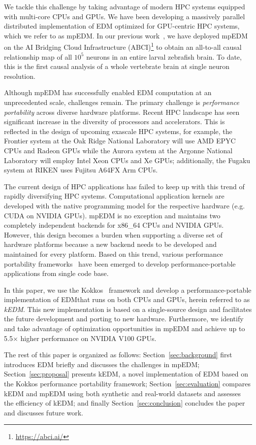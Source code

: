 \documentclass[sigconf]{acmart}
\begin{document}
We tackle this challenge by taking advantage of modern HPC systems equipped
with multi-core CPUs and GPUs. We have been developing a massively
parallel distributed implementation of EDM optimized for GPU-centric HPC
systems, which we refer to as mpEDM. In our previous work~\cite{mpedm}, we have deployed mpEDM on the AI
Bridging Cloud Infrastructure (ABCI)\footnote{\url{https://abci.ai/}} to
obtain an all-to-all causal relationship map of all $10^5$ neurons in an
entire larval zebrafish brain. To date, this is the first causal analysis
of a whole vertebrate brain at single neuron resolution.

Although mpEDM has successfully enabled EDM computation at an unprecedented
scale, challenges remain. The primary challenge is
\textit{performance portability} across diverse hardware platforms. Recent HPC
landscape has seen significant increase in the diversity of processors and
accelerators. This is reflected in the design of upcoming exascale HPC systems, for example, 
the Frontier system at the Oak Ridge National Laboratory will use AMD EPYC
CPUs and Radeon GPUs while the Aurora system at the Argonne National
Laboratory will employ Intel Xeon CPUs and Xe GPUs; additionally, the Fugaku system at RIKEN
uses Fujitsu A64FX Arm CPUs.

The current design of HPC applications has failed to keep up with this trend
of rapidly diversifying HPC systems. Computational application kernels are developed with the native programming model for the
respective hardware (e.g. CUDA on NVIDIA GPUs). mpEDM is no exception and
maintains two completely independent backends for x86\_64 CPUs and NVIDIA
GPUs. However, this design becomes a burden when supporting a diverse set of
hardware platforms because a new backend needs to be developed and maintained
for every platform. Based on this trend, various performance portability
frameworks~\cite{Deakin2019, Deakin2020} have been emerged to develop
performance-portable applications from single code base.

In this paper, we use the Kokkos~\cite{Edwards2014} framework and develop a performance-portable implementation of EDM\@ that runs on
both CPUs and GPUs, herein referred to as \textit{kEDM}. This new implementation is based on a single-source design and
facilitates the future development and porting to new hardware. Furthermore,
we identify and take advantage of optimization opportunities in mpEDM and
achieve up to 5.5$\times$ higher performance on NVIDIA V100 GPUs.

The rest of this paper is organized as follows: Section~\ref{sec:background}
first introduces EDM briefly and discusses the challenges in mpEDM\@;
Section~\ref{sec:proposal} presents kEDM, a novel implementation of EDM based on the Kokkos performance portability framework;
Section~\ref{sec:evaluation} compares kEDM and mpEDM using both synthetic and
real-world datasets and assesses the efficiency of kEDM\@; and finally
Section~\ref{sec:conclusion} concludes the paper and discusses future work.
\end{document}
